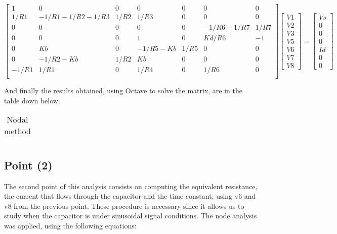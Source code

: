 $$
\begin{bmatrix} 
   1     & 0               & 0    & 0           & 0    & 0          & 0    \\
   1/R1  & -1/R1-1/R2-1/R3 & 1/R2 & 1/R3        & 0    & 0          & 0    \\
   0     & 0               & 0    & 0           & 0    & -1/R6-1/R7 & 1/R7 \\
   0     & 0               & 0    & 1           & 0    & Kd/R6      & -1   \\
   0     & Kb              & 0    & -1/R5-Kb    & 1/R5 & 0          & 0    \\
   0     & -1/R2-Kb        & 1/R2 & Kb          & 0    & 0          & 0    \\
   -1/R1 & 1/R1            & 0    & 1/R4        & 0    & 1/R6       & 0    \\
\end {bmatrix} 
\begin{bmatrix}
V1 \\ V2 \\ V3 \\ V5 \\ V6 \\ V7 \\ V8
\end {bmatrix} 
=
\begin{bmatrix} 
Vs \\ 0 \\ 0 \\ 0 \\ Id \\ 0 \\ 0
\end {bmatrix} 
$$ 

\vspace{0.5cm}
And finally the results obtained, using Octave to solve the matrix, are in the table down below. 

\FloatBarrier
\begin{table}[h]
  \centering
  \begin{tabular}{|c|c|c|c|c|c|c|}
    \hline    
    
    \hline
  \end{tabular}
  \caption{Nodal method}
  \label{tab:nodal}
\end{table}
\FloatBarrier

\subsection{Point (2)} 

The second point of this analysis consists on computing the equivalent resistance, the current that flows through the capacitor and the time constant, using v6 and v8 from the previous point. 
These procedure is necessary since it allows us to study when the capacitor is under sinusoidal signal conditions.   
The node analysis was applied, using the following equations:
 
